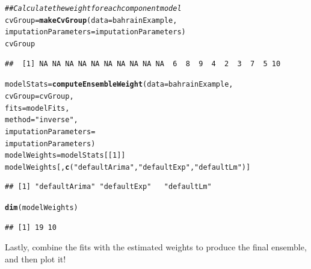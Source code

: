 \documentclass[nojss]{jss}\usepackage[]{graphicx}\usepackage[]{color}
\makeatletter
\newcommand{\hlnum}[1]{\textcolor[rgb]{0.686,0.059,0.569}{#1}}%
\newcommand{\hlstr}[1]{\textcolor[rgb]{0.192,0.494,0.8}{#1}}%
\newcommand{\hlcom}[1]{\textcolor[rgb]{0.678,0.584,0.686}{\textit{#1}}}%
\newcommand{\hlstd}[1]{\textcolor[rgb]{0.345,0.345,0.345}{#1}}%
\newcommand{\hlkwb}[1]{\textcolor[rgb]{0.69,0.353,0.396}{#1}}%
\newcommand{\hlkwc}[1]{\textcolor[rgb]{0.333,0.667,0.333}{#1}}%
\newcommand{\hlkwd}[1]{\textcolor[rgb]{0.737,0.353,0.396}{\textbf{#1}}}%
\newenvironment{kframe}{%
 \def\at@end@of@kframe{}%
 \ifinner\ifhmode%
  \def\at@end@of@kframe{\end{minipage}}%
  \begin{minipage}{\columnwidth}%
 \fi\fi%
 \def\FrameCommand##1{\hskip\@totalleftmargin \hskip-\fboxsep
 \colorbox{shadecolor}{##1}\hskip-\fboxsep
     \hskip-\linewidth \hskip-\@totalleftmargin \hskip\columnwidth}%
 \MakeFramed {\advance\hsize-\width
   \@totalleftmargin\z@ \linewidth\hsize
   \@setminipage}}%
 {\par\unskip\endMakeFramed%
 \at@end@of@kframe}
\newenvironment{knitrout}{}{} %
\makeatother
\begin{document}
\begin{knitrout}
\color{fgcolor}\begin{kframe}
\begin{alltt}
\hlcom{## Calculate the weight for each component model}
\hlstd{cvGroup} \hlkwb{=} \hlkwd{makeCvGroup}\hlstd{(}\hlkwc{data} \hlstd{= bahrainExample,}
                      \hlkwc{imputationParameters} \hlstd{= imputationParameters)}
\hlstd{cvGroup}
\end{alltt}
\begin{verbatim}
##  [1] NA NA NA NA NA NA NA NA NA NA  6  8  9  4  2  3  7  5 10
\end{verbatim}
\begin{alltt}
\hlstd{modelStats} \hlkwb{=} \hlkwd{computeEnsembleWeight}\hlstd{(}\hlkwc{data} \hlstd{= bahrainExample,}
                                   \hlkwc{cvGroup} \hlstd{= cvGroup,}
                                   \hlkwc{fits} \hlstd{= modelFits,}
                                   \hlkwc{method} \hlstd{=} \hlstr{"inverse"}\hlstd{,}
                                   \hlkwc{imputationParameters} \hlstd{=}
                                       \hlstd{imputationParameters)}
\hlstd{modelWeights} \hlkwb{=} \hlstd{modelStats[[}\hlnum{1}\hlstd{]]}
\hlstd{modelWeights[,} \hlkwd{c}\hlstd{(}\hlstr{"defaultArima"}\hlstd{,} \hlstr{"defaultExp"}\hlstd{,} \hlstr{"defaultLm"}\hlstd{)]}
\end{alltt}
\begin{verbatim}
## [1] "defaultArima" "defaultExp"   "defaultLm"
\end{verbatim}
\begin{alltt}
\hlkwd{dim}\hlstd{(modelWeights)}
\end{alltt}
\begin{verbatim}
## [1] 19 10
\end{verbatim}
\end{kframe}
\end{knitrout}

Lastly, combine the fits with the estimated weights to produce the final
ensemble, and then plot it!
\end{document}
